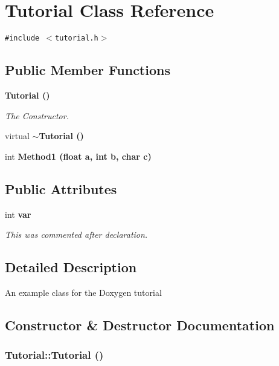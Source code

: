 \section{Tutorial Class Reference}
\label{classTutorial}
{\tt \#include $<$tutorial.h$>$}

\subsection*{Public Member Functions}
\begin{CompactItemize}
\item 
\bf{Tutorial} ()
\begin{CompactList}\small\item\em The Constructor. \item\end{CompactList}\item 
virtual \bf{$\sim$Tutorial} ()
\item 
int \bf{Method1} (float a, int b, char c)
\end{CompactItemize}
\subsection*{Public Attributes}
\begin{CompactItemize}
\item 
int \bf{var}
\begin{CompactList}\small\item\em This was commented after declaration. \item\end{CompactList}\end{CompactItemize}


\subsection{Detailed Description}
An example class for the Doxygen tutorial 



\subsection{Constructor \& Destructor Documentation}
\subsubsection{\setlength{\rightskip}{0pt plus 5cm}Tutorial::Tutorial ()}\label{classTutorial_d7c4fc0559170fee4a60b9f67ceb3333}


